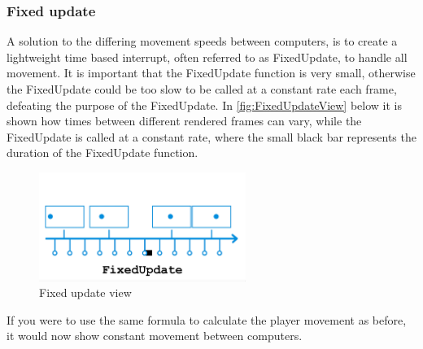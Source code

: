 \documentclass{article} %
\begin{document}
\subsubsection{Fixed update}
A solution to the differing movement speeds between computers, is to create a lightweight time based interrupt, often referred to as FixedUpdate, to handle all movement.
It is important that the FixedUpdate function is very small, otherwise the FixedUpdate could be too slow to be called at a constant rate each frame, defeating the purpose of the FixedUpdate.
In \autoref{fig:FixedUpdateView} below it is shown how times between different rendered frames can vary, while the FixedUpdate is called at a constant rate, where the small black bar represents the duration of the FixedUpdate function.
\begin{figure}[h!]
    \centering
    \includegraphics[width=0.6\textwidth]{fixed_update_explanation.png}
    \caption{Fixed update view}
    \label{fig:FixedUpdateView}
\end{figure}
\newline
If you were to use the same formula to calculate the player movement as before, it would now show constant movement between computers.
\end{document}
